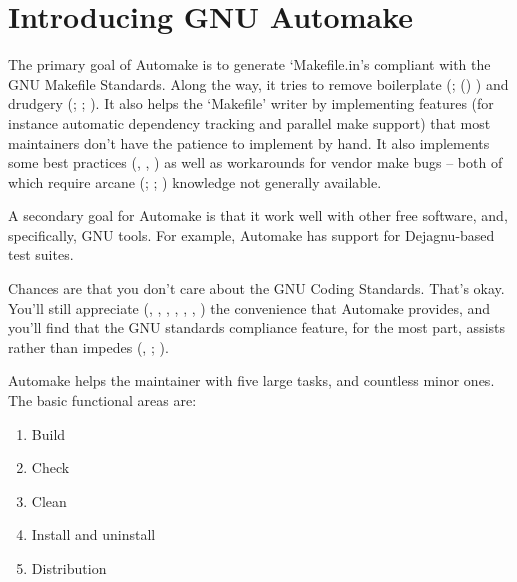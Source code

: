 \chapter{Introducing GNU Automake}\label{C_Introducing_GNU_Automake}


The primary goal of Automake is to generate `Makefile.in's compliant with the 
GNU Makefile Standards. Along the way, it tries to remove 
boilerplate ({\MbQ{}}; ({\MbQ{}}) {\McQ{}}) and 
drudgery ({\McQ{}}; {\MjQ{}}; {\MaQ{}}). It also helps the `Makefile' writer by 
implementing features (for instance automatic dependency tracking and parallel 
make support) that most maintainers don't have the patience to implement by 
hand. It also implements some best practices ({\McQ{}}, {\MbQ{}}, {\MfQ{}}) as well as 
workarounds for 
vendor make bugs -- both of which require 
arcane ({\MbQ{}}; {\MaQ{}}; {\MlQ{}})
knowledge not generally 
available. 


A secondary goal for Automake is that it work well with other free software, and, specifically, GNU tools. For example, Automake has support for Dejagnu-based test suites. 


Chances are that you don't care about the GNU Coding Standards. That's okay.
You'll still appreciate ({\MgQ{}}, {\MjQ{}}, {\MbQ{}}, {\MbQ{}}, {\McQ{}}, {\McQ{}}, {\MaQ{}}) the 
convenience that Automake provides, and you'll find that the GNU standards 
compliance feature, for the most part,
assists rather than impedes ({\MeQ{}}, {\MjQ{}}; {\MjQ{}}). 


Automake helps the maintainer with five large tasks, and countless minor ones. The basic functional areas are: 


\begin{enumerate}
\item Build 
\item Check 
\item Clean 
\item Install and uninstall 
\item Distribution 
\end{enumerate}

